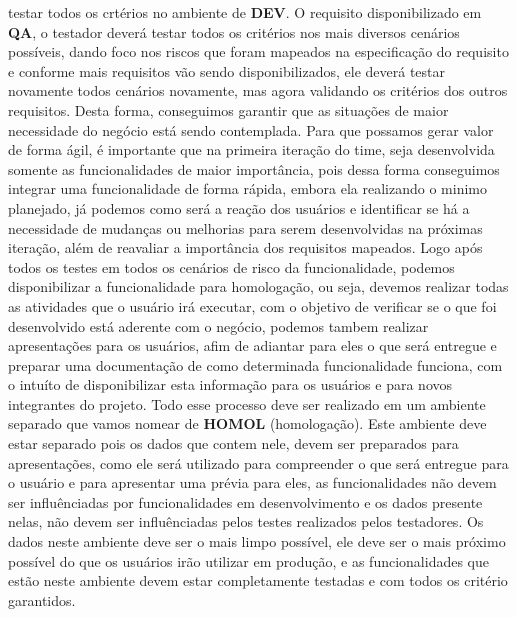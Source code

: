       testar todos os crtérios no ambiente de \textbf{DEV}. O requisito disponibilizado
      em \textbf{QA}, o testador deverá testar todos os critérios nos mais diversos
      cenários possíveis, dando foco nos riscos que foram mapeados na especificação
      do requisito e conforme mais requisitos vão sendo disponibilizados, ele deverá
      testar novamente todos cenários novamente, mas agora validando os critérios
      dos outros requisitos. Desta forma, conseguimos garantir que as situações de
      maior necessidade do negócio está sendo contemplada. Para que possamos gerar
      valor de forma ágil, é importante que na primeira iteração do time, seja
      desenvolvida somente as funcionalidades de maior importância, pois dessa
      forma conseguimos integrar uma funcionalidade de forma rápida, embora ela
      realizando o minimo planejado, já podemos como será a reação dos usuários e
      identificar se há a necessidade de mudanças ou melhorias para serem desenvolvidas
      na próximas iteração, além de reavaliar a importância dos requisitos mapeados. \newline
      Logo após todos os testes em todos os cenários de risco da funcionalidade,
      podemos disponibilizar a funcionalidade para homologação, ou seja, devemos
      realizar todas as atividades que o usuário irá executar, com o objetivo de
      verificar se o que foi desenvolvido está aderente com o negócio, podemos
      tambem realizar apresentações para os usuários, afim de adiantar para eles
      o que será entregue e preparar uma documentação de como determinada funcionalidade
      funciona, com o intuíto de disponibilizar esta informação para os usuários e
      para novos integrantes do projeto. Todo esse processo deve ser realizado em
      um ambiente separado que vamos nomear de \textbf{HOMOL} (homologação). Este ambiente deve
      estar separado pois os dados que contem nele, devem ser preparados para
      apresentações, como ele será utilizado para compreender o que será entregue
      para o usuário e para apresentar uma prévia para eles, as funcionalidades
      não devem ser influênciadas por funcionalidades em desenvolvimento e os
      dados presente nelas, não devem ser influênciadas pelos testes realizados
      pelos testadores. Os dados neste ambiente deve ser o mais limpo possível,
      ele deve ser o mais próximo possível do que os usuários irão utilizar em
      produção, e as funcionalidades que estão neste ambiente devem estar completamente
      testadas e com todos os critério garantidos. \newline
